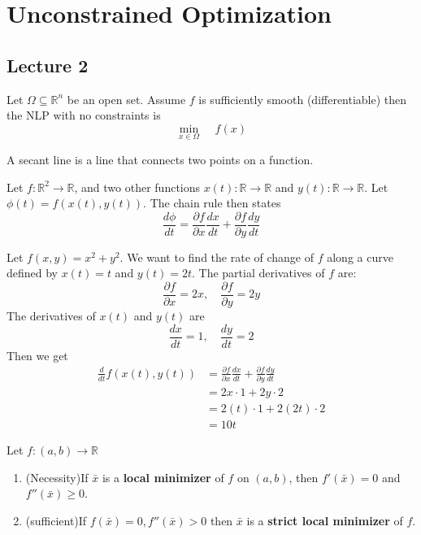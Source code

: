\section{Unconstrained Optimization}
\subsection{Lecture 2}
\begin{problem}
    Let $\Omega \subseteq \mathbb R^n$ be an open set. Assume $f$ is sufficiently smooth (differentiable) then the NLP with no constraints is $$\min_{x \in \Omega} \;\;\;\; f(x)$$
\end{problem}
\begin{definition}
    A secant line is a line that connects two points on a function.
\end{definition}
\begin{theorem}
    Let $f: \mathbb R^2 \rightarrow \mathbb R$, and two other functions $x(t): \mathbb R \rightarrow \mathbb R$ and $y(t): \mathbb R \rightarrow \mathbb R$. Let $\phi(t) = f(x(t), y(t))$. The chain rule then states
    $$\frac{d\phi}{dt} = \frac{\partial f}{\partial x} \frac{dx}{dt} + \frac{\partial f}{\partial y} \frac{dy}{dt}$$
\end{theorem}
\begin{problem}
    Let $f(x,y) = x^2 + y^2$. We want to find the rate of change of $f$ along a curve defined by $x(t) = t$ and $y(t) = 2t$. The partial derivatives of $f$ are: $$\frac{\partial f}{\partial x} = 2x, \quad \frac{\partial f}{\partial y} = 2y$$ The derivatives of $x(t)$ and $y(t)$ are $$\frac{dx}{dt} = 1, \quad \frac{dy}{dt} = 2$$ Then we get
    \begin{align*}
        \frac{d}{dt} f(x(t), y(t)) &= \frac{\partial f}{\partial x} \frac{dx}{dt} + \frac{\partial f}{\partial y} \frac{dy}{dt} \\
        &= 2x \cdot 1 + 2y \cdot 2 \\
        &= 2(t) \cdot 1 + 2(2t) \cdot 2 \\
        &= 10t
    \end{align*}
\end{problem}
\begin{corollary}
    Let $f: (a,b) \rightarrow \mathbb R$
    \begin{enumerate}
        \item (Necessity)If $\bar x$ is a \textbf{local minimizer} of $f$ on $(a,b)$, then $f'(\bar x) = 0$ and $f''(\bar x) \geq 0$.
        \item (sufficient)If $f(\bar x) = 0, f''(\bar x) > 0$ then $\bar x$ is a \textbf{strict local minimizer} of $f$.
    \end{enumerate}

    
\end{corollary}
